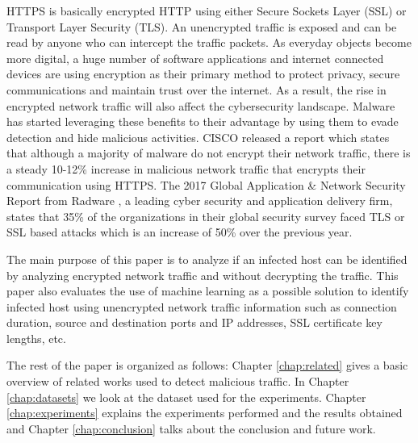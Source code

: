HTTPS is basically encrypted HTTP using either Secure Sockets Layer (SSL) or Transport Layer Security (TLS). An unencrypted traffic is exposed and can be read by anyone who can intercept the traffic packets. As everyday objects become more digital, a huge number of software applications and internet connected devices are using encryption as their primary method to protect privacy, secure communications and maintain trust over the internet. As a result, the rise in encrypted network traffic will also affect the cybersecurity landscape. Malware has started leveraging these benefits to their advantage by using them to evade detection and hide malicious activities. CISCO released a report \cite{Anderson16} which states that although a majority of malware do not encrypt their network traffic, there is a steady 10-12\% increase in malicious network traffic that encrypts their communication using HTTPS. The 2017 Global Application \& Network Security Report from Radware \cite{Radware17}, a leading cyber security and application delivery firm, states that 35\% of the organizations in their global security survey faced TLS or SSL based attacks which is an increase of 50\% over the previous year.

The main purpose of this paper is to analyze if an infected host can be identified by analyzing encrypted network traffic and without decrypting the traffic. This paper also evaluates the use of machine learning as a possible solution to identify infected host using unencrypted network traffic information such as connection duration, source and destination ports and IP addresses, SSL certificate key lengths, etc.

The rest of the paper is organized as follows: Chapter \ref{chap:related} gives a basic overview of related works used to detect malicious traffic. In Chapter \ref{chap:datasets} we look at the dataset used for the experiments. Chapter \ref{chap:experiments} explains the experiments performed and the results obtained and Chapter \ref{chap:conclusion} talks about the conclusion and future work.
